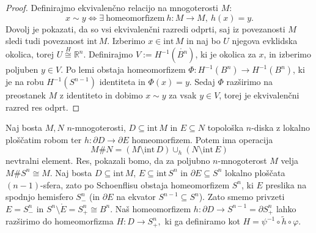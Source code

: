 \documentclass[10pt, a4paper]{article}
\newenvironment{noticeC}{%
  \tcolorbox[%
  notitle,
  empty,
  enhanced,  %
  breakable,
  coltext=black, 
  fontupper=\rmfamily,
  noparskip,
  sharp corners,
  boxrule=-1pt,  %
  frame hidden,
  left=7pt,  %
  right=7pt,
  top=5pt,
  bottom=5pt,
  before skip=2.5ex plus 2pt,
  after skip=2.5ex plus 2pt,
  overlay unbroken and last={%
  },
  ]}
{\endtcolorbox}
\newenvironment{dokaz}%
  {\begin{noticeC}\begin{proof}}%
  {\end{proof}\end{noticeC}}
\newcommand{\R}{\mathbb {R}}
\newcommand{\intem}{\mathrm{int}\,}
\begin{document}
\begin{dokaz}
  Definirajmo ekvivalenčno relacijo na mnogoterosti $M$:
  $$x \sim y \Leftrightarrow \exists\ \mathrm{homeomorfizem}\ h: M \to M,\ h(x) = y.$$
  Dovolj je pokazati, da so vsi ekvivalenčni razredi odprti, saj iz povezanosti $M$
  sledi tudi povezanost $\intem M$. Izberimo $x \in \intem M$
  in naj bo $U$ njegova evklidska okolica, torej $U \stackrel{H}{\cong} \R^n$.
  Definirajmo $V := H^{-1}(\mathring{B^n})$, ki je okolica za $x$, in izberimo poljuben 
  $y \in V.$ Po lemi obstaja homeomorfizem $\Phi: H^{-1} (B^n) \to H^{-1} (B^n)$,
  ki je na robu $H^{-1} (S^{n - 1})$ identiteta in $\Phi(x) = y.$
  Sedaj $\Phi$ razširimo na preostanek $M$ z identiteto in dobimo 
  $x \sim y$ za vsak $y \in V$, torej je ekvivalenčni razred res odprt.
\end{dokaz}

Naj bosta $M, N$ $n$-mnogoterosti, $D \subseteq \intem M$ in $E \subseteq N$ topološka $n$-diska z lokalno ploščatim robom 
ter $h: \partial D \to \partial E$ homeomorfizem. Potem ima operacija 
$$M \# N = (M \setminus \intem D) \cup_h (N \setminus \intem E)$$
nevtralni element. Res, pokazali bomo, da za poljubno $n$-mnogoterost $M$ velja $M \# S^n \cong M$.
Naj bosta $D \subseteq \intem M$, $E \subseteq \intem S^n$ in $\partial E \subseteq S^n$ 
lokalno ploščata $(n - 1)$-sfera, zato po Schoenflisu obstaja homeomorfizem $S^n$, ki $E$
preslika na spodnjo hemisfero $S^n_-$ (in $\partial E$ na ekvator $S^{n - 1} \subseteq S^n$).
Zato smemo privzeti $E = S^n_-$ in $S^n \setminus \mathring{E} = S_+^n \cong B^n$.
Naš homeomorfizem $h: \partial D \to S^{n - 1} = \partial S_+ ^n$ lahko razširimo do homeomorfizma 
$H: D \to S_+^n,$ ki ga definiramo kot $H = \psi^{-1} \circ \tilde{h} \circ \varphi.$ 
\end{document}

